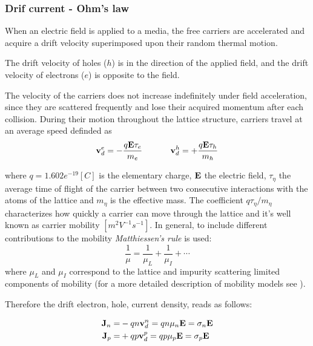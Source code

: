 \subsubsection{Drif current - Ohm's law}

When an electric field is applied to a media, the free carriers are accelerated and acquire a drift velocity superimposed upon their random thermal motion.

\begin{Osservazione}
The drift velocity of holes ($h$) is in the direction of the applied field, and the drift velocity of electrons ($e$) is opposite to the field.
\end{Osservazione}

The velocity of the carriers does not increase indefinitely under field acceleration, since they are scattered frequently and lose their acquired momentum after each collision.
During their motion throughout the lattice structure, carriers travel at an average speed definded as
\begin{equation}
\label{eq: velocities}
\vect{v}_d^e = - \dfrac{q\vect{E}\tau_e}{m_e}  \psp{20} 
\vect{v}_d^h = + \dfrac{q\vect{E}\tau_h}{m_h}
\end{equation}

where $q=1.602e^{-19}[C]$ is the elementary charge, $\mathbf{E}$ the electric field, $\tau_\eta$ the average time of flight of the carrier between two consecutive interactions with the atoms of the lattice and $m_\eta$ is the effective mass.
The coefficient $q\tau_\eta / m_\eta$ characterizes how quickly a carrier can move through the lattice and it's well known as carrier mobility $[m^2V^{-1}s^{-1}]$.
In general, to include different contributions to the mobility \textit{Matthiessen's rule} is used:
\begin{equation}
\dfrac{1}{\mu} = \dfrac{1}{\mu_L} + \dfrac{1}{\mu_I} + \cdots
\end{equation}
where $\mu_L$ and $\mu_I$ correspond to the lattice and impurity scattering limited components of mobility (for a more detailed description of mobility models see \cite{ModernVLSIdevices}). 

Therefore the drift electron, hole, current density, reads as follows:

\begin{align}
\mathbf{J}_n =& -qn\mathbf{v}_d^n = qn\mu_n\mathbf{E}   = \sigma_n\mathbf{E} \label{eq: drift electron} \\ 
\mathbf{J}_p =& +qp\mathbf{v}_d^p = qp\mu_p\mathbf{E} = \sigma_p\mathbf{E} \label{eq: drift hole}
\end{align}

